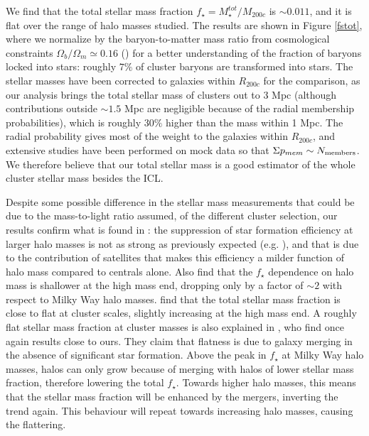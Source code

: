 {We find that the total stellar mass fraction $f_\star=M_\star^{tot}/M_{200c}$ is $\sim 0.011$, and it is flat over the range of halo masses studied. The results are shown in Figure \ref{fstot}, where we normalize by the baryon-to-matter mass ratio from cosmological constraints $\Omega_b/\Omega_m \simeq 0.16$ (\citealt{planck16}) for a better understanding of the fraction of baryons locked into stars: roughly $7\%$ of cluster baryons are transformed into stars. The stellar masses have been corrected to galaxies within $R_{200c}$ for the comparison, as our analysis brings the total stellar mass of clusters out to 3 Mpc (although contributions outside $\sim 1.5$ Mpc are negligible because of the radial membership probabilities), which is roughly $30\%$ higher than the mass within 1 Mpc. The radial probability gives most of the weight to the galaxies within $R_{200c}$, and extensive studies have been performed on mock data so that $\Sigma p_{mem}\sim N_{\rm members}$. We therefore believe that our total stellar mass is a good estimator of the whole cluster stellar mass besides the ICL.

Despite some possible difference in the stellar mass measurements that could be due to the mass-to-light ratio assumed, of the different cluster selection, our results confirm what is found in \citet{kravtsov}: the suppression of star formation efficiency at larger halo masses is not as  strong as previously expected (e.g. \citealt{behroozi}), and that is due to the contribution of satellites that makes this efficiency a milder function of halo mass compared to centrals alone. Also \citet{illustris} find that the $f_\star$ dependence on halo mass is shallower at the high mass end, dropping only by a factor of $\sim 2$ with respect to Milky Way halo masses. 
\citet{coupon} find that the total stellar mass fraction is close to flat at cluster scales, slightly increasing at the high mass end. %
A roughly flat stellar mass fraction at cluster masses is also explained in \citet{leauthaud}, who find once again results close to ours. They claim that flatness is due to galaxy merging in the absence of significant star formation. Above the peak in $f_\star$ at Milky Way halo masses, halos can only grow because of merging with halos of lower stellar mass fraction, therefore lowering the total $f_\star$. Towards higher halo masses, this means that the stellar mass fraction will be enhanced by the mergers, inverting the trend again. This behaviour will repeat towards increasing halo masses, causing the flattering.

}
